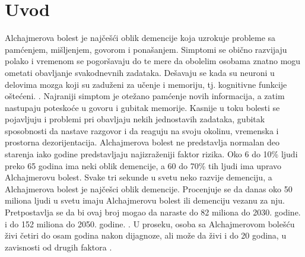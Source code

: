 \documentclass[12pt,oneside]{memoir}
\begin{document}
\frontmatter
\naslovna
\komisija

\tableofcontents{}

\mainmatter


\chapter{Uvod}

Alchajmerova bolest je najčešći oblik demencije koja uzrokuje probleme sa pamćenjem, mišljenjem, govorom i ponašanjem.  Simptomi se obično razvijaju polako i vremenom se pogoršavaju do te mere da obolelim osobama znatno mogu ometati obavljanje svakodnevnih zadataka.  Dešavaju se kada su neuroni u delovima mozga koji su zaduženi za učenje i memoriju, tj. kognitivne funkcije oštećeni. \cite{Alzheimerfactsfigures}.  Najraniji simptom je otežano pamćenje novih informacija, a zatim nastupaju poteskoće u govoru i gubitak memorije.  Kasnije u toku bolesti se pojavljuju i problemi pri obavljaju nekih jednostavih zadataka,  gubitak sposobnosti da nastave razgovor i da reaguju na svoju okolinu,  vremenska i prostorna dezorijentacija.  Alchajmerova bolest ne predstavlja normalan deo starenja iako godine predstavljaju najizraženiji faktor rizika.  Oko 6 do 10\% ljudi preko 65 godina ima neki oblik demencije,  a 60 do 70\% tih ljudi ima upravo Alchajmerovu bolest.\cite{actavis} Svake tri sekunde u svetu neko razvije demenciju, a Alchajmerova bolest je najčešci oblik demencije.  Procenjuje se da danas oko 50 miliona ljudi u svetu imaju Alchajmerovu bolest ili demenciju vezanu za nju.  Pretpostavlja se da bi ovaj broj mogao da naraste do 82 miliona do 2030.  godine. i do 152 miliona do 2050. godine.  \cite{Languageimpairment}.  U proseku, osoba sa Alchajmerovom bolešću živi četiri do osam godina nakon dijagnoze,  ali može da živi i do 20 godina, u zavisnosti od drugih faktora \cite{seracell}. 
\end{document}
